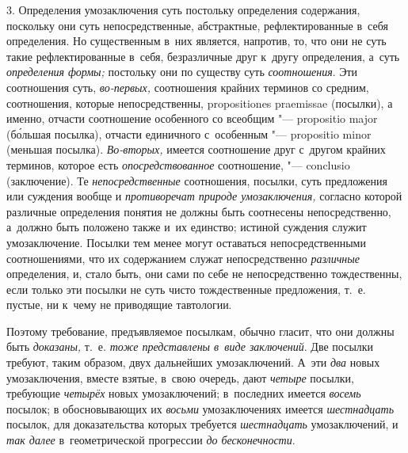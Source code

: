 3. Определения умозаключения суть постольку определения
содержания, поскольку они суть непосредственные, абстрактные,
рефлектированные в~себя определения. Но существенным в~них является,
напротив, то, что они не суть такие рефлектированные в~себя, безразличные
друг к~другу определения, а~суть
{\em определения формы;}
постольку они по существу суть
{\em соотношения}. Эти
соотношения суть, {\em во-первых,}
соотношения крайних терминов со средним, соотношения, которые
непосредственны, proposi\-tiones prae\-missae (посылки), а
именно, отчасти соотношение особенного со всеобщим "--- propositio major
(б\'{о}льшая посылка), отчасти единичного с~особенным "---
propositio minor (меньшая посылка).
{\em Во-вторых,} имеется
соотношение друг с~другом крайних терминов, которое есть
{\em опосредствованное}
соотношение, "--- conclusio (заключение). Те
{\em непосредственные}
соотношения, посылки, суть предложения или суждения вообще и
{\em противоречат природе
умозаключения,} согласно которой различные определения
понятия не должны быть соотнесены непосредственно, а~должно быть положено
также и~их единство; истиной суждения служит умозаключение. Посылки тем
менее могут оставаться непосредственными соотношениями, что их содержанием
служат непосредственно {\em различные}
определения, и, стало быть, они сами по себе не
непосредственно тождественны, если только эти посылки не суть чисто
тождественные предложения, т.~е. пустые, ни к~чему не приводящие
тавтологии.

Поэтому требование, предъявляемое посылкам, обычно гласит, что
они должны быть {\em доказаны,}
т.~е. {\em тоже
представлены в~виде заключений}. Две посылки требуют, таким
образом, двух дальнейших умозаключений. А~эти
{\em два} новых
умозаключения, вместе взятые, в~свою очередь, дают
{\em четыре} посылки,
требующие {\em четырёх}
новых умозаключений; в~последних имеется
{\em восемь} посылок; в
обосновывающих их {\em восьми}
умозаключениях имеется
{\em шестнадцать}
посылок, для доказательства которых требуется
{\em шестнадцать}
умозаключений, и {\em так
далее} в~геометрической прогрессии
{\em до бесконечности}.


